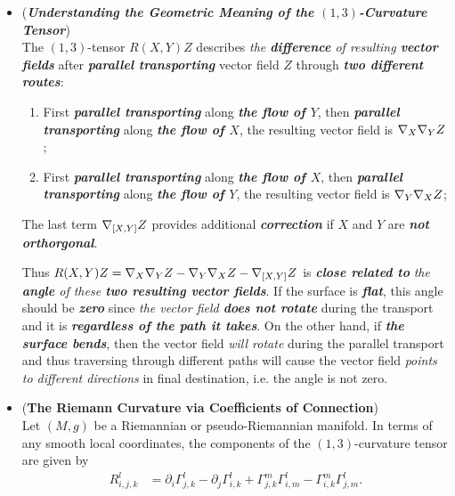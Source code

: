 \documentclass[11pt]{article}
\begin{document}
\begin{itemize}
\item \begin{remark} (\emph{\textbf{Understanding the Geometric Meaning of the $(1,3)$-Curvature Tensor}})\\
The  $(1,3)$-tensor $R(X, Y)Z$ describes \emph{the \textbf{difference} of  resulting \textbf{vector fields}} after \emph{\textbf{parallel transporting}} vector field $Z$ through \emph{\textbf{two different routes}}: 
\begin{enumerate}
\item First \emph{\textbf{parallel transporting}} along \emph{\textbf{the flow of $Y$}}, then \emph{\textbf{parallel transporting}} along \emph{\textbf{the flow of $X$}}, the resulting vector field is $ \nabla_{X}{\nabla_{Y}{Z}}$;
\item First \emph{\textbf{parallel transporting}} along \emph{\textbf{the flow of $X$}}, then \emph{\textbf{parallel transporting}} along \emph{\textbf{the flow of $Y$}}, the resulting vector field is $ \nabla_{Y}{\nabla_{X}{Z}}$;
\end{enumerate}
The last term $\nabla_{[X, Y]}{Z}$ provides additional \emph{\textbf{correction}} if $X$ and $Y$ are \emph{\textbf{not orthorgonal}}.

Thus $R(X, Y)Z = \nabla_{X}{\nabla_{Y}{Z}} - \nabla_{Y}{\nabla_{X}{Z}}  -  \nabla_{[X, Y]}{Z}$ is \emph{\textbf{close related to}} \emph{the \textbf{angle} of these \textbf{two resulting vector fields}}. If the surface is \emph{\textbf{flat}}, this angle should be \emph{\textbf{zero}} since \emph{the vector field \textbf{does not rotate}} during the transport and it is \emph{\textbf{regardless of the path it takes}}. On the other hand, if \emph{\textbf{the surface bends}}, then the vector field \emph{will rotate} during the parallel transport and thus traversing through different paths will cause the vector field \emph{points to different directions} in final destination, i.e. the angle is not zero.
\end{remark}

\item \begin{proposition} (\textbf{The Riemann Curvature via Coefficients of Connection}) \citep{lee2018introduction}\\
Let $(M,g)$ be a Riemannian or pseudo-Riemannian manifold. In terms of any smooth local coordinates, the components of the $(1,3)$-curvature tensor are given by
\begin{align}
R_{i,j,k}^l &= \partial_i \Gamma_{j,k}^{l} -\partial_j \Gamma_{i,k}^{l} + \Gamma_{j,k}^{m}\Gamma_{i,m}^{l}- \Gamma_{i,k}^{m}\Gamma_{j,m}^{l}. \label{eqn: rieman_curvature_13_tensor_coefficient}
\end{align}
\end{proposition}


\end{itemize}
\end{document}
